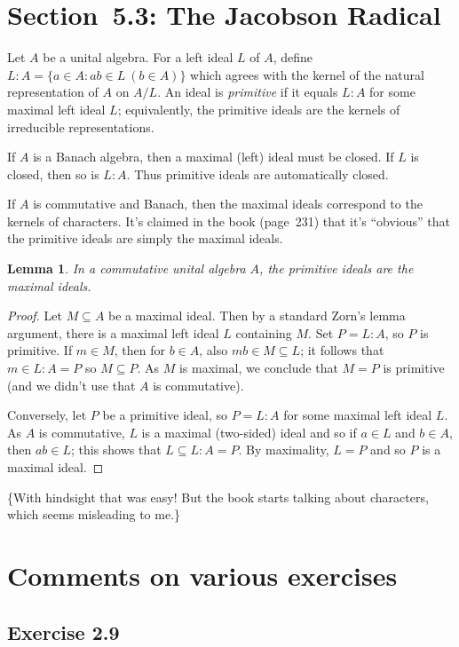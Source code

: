\documentclass[twoside,12pt,a4paper]{article}
\theoremstyle{plain}
\newtheorem{lemma}[proposition]{Lemma}
\theoremstyle{definition}
\begin{document}
\section{Section~5.3: The Jacobson Radical}

Let $A$ be a unital algebra.  For a left ideal $L$ of $A$, define
$L:A=\{a\in A:ab\in L \ (b\in A) \}$ which agrees with the kernel of the natural
representation of $A$ on $A/L$.  An ideal is \emph{primitive} if it equals $L:A$
for some maximal left ideal $L$; equivalently, the primitive ideals are the
kernels of irreducible representations.

If $A$ is a Banach algebra, then a maximal (left) ideal must be closed.
If $L$ is closed, then so is $L:A$.
Thus primitive ideals are automatically closed.

If $A$ is commutative and Banach, then the maximal ideals correspond to the
kernels of characters.  It's claimed in the book (page~231) that it's ``obvious''
that the primitive ideals are simply the maximal ideals.

\begin{lemma}
In a commutative unital algebra $A$, the primitive ideals are the maximal ideals.
\end{lemma}
\begin{proof}
Let $M\subseteq A$ be a maximal ideal.  Then by a standard Zorn's lemma
argument, there is a maximal left ideal $L$ containing $M$.  Set $P=L:A$,
so $P$ is primitive.  If $m\in M$, then for $b\in A$, also $mb\in M \subseteq
L$; it follows that $m\in L:A=P$ so $M\subseteq P$.  As $M$ is maximal, we
conclude that $M=P$ is primitive (and we didn't use that $A$ is commutative).

Conversely, let $P$ be a primitive ideal, so $P=L:A$ for some maximal left ideal
$L$.  As $A$ is commutative, $L$ is a maximal (two-sided) ideal and so if
$a\in L$ and $b\in A$, then $ab\in L$; this shows that $L\subseteq L:A=P$.
By maximality, $L=P$ and so $P$ is a maximal ideal.
\end{proof}

\{With hindsight that was easy!  But the book starts talking about characters,
which seems misleading to me.\}



\section{Comments on various exercises}

\subsection{Exercise 2.9}
\end{document}
